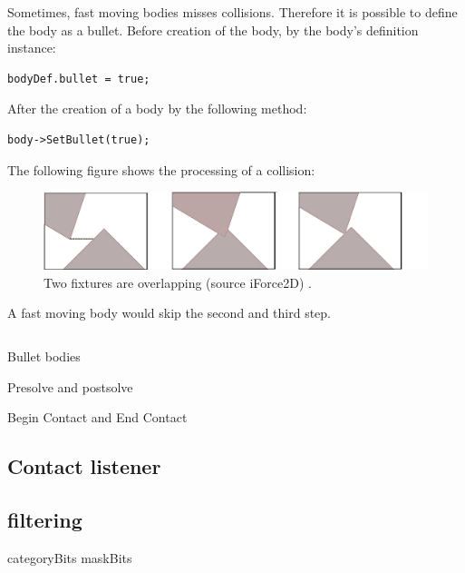 \documentclass[10pt,a4paper,DIV=11]{scrreprt}
\begin{document}
Sometimes, fast moving bodies misses collisions. Therefore it is possible to define the body as a bullet. Before creation of the body, by the body's definition instance:

\begin{lstlisting}[caption={Define fixture as bullet before creation},label=lst:fixture-bullet-before]
bodyDef.bullet = true;
\end{lstlisting}

After the creation of a body by the following method:

\begin{lstlisting}[caption={Define fixture as bullet after creation},label=lst:fixture-bullet-after]
body->SetBullet(true);
\end{lstlisting}

The following figure shows the processing of a collision:

\begin{center}
	\begin{figure}[H]
		\centering
		\includegraphics[width=1.0\textwidth,scale=1.0]{files/fixtures-overlap.png}
		\caption{Two fixtures are overlapping (source iForce2D) \cite{box2d-iforce}.}
		\label{fig:fixture-overlap}
	\end{figure}
\end{center}

A fast moving body would skip the second and third step.

\begin{lstlisting}[caption={Begin Contact method},label=lst:collision-bcontact]

\end{lstlisting}

Bullet bodies

Presolve and postsolve

Begin Contact and End Contact

\subsection{Contact listener}

\subsection{filtering}
categoryBits
maskBits
\end{document}
